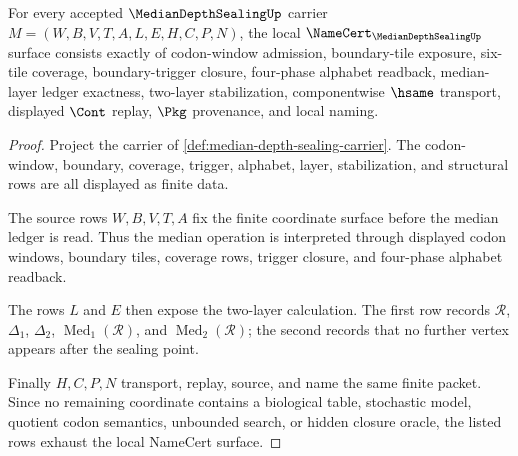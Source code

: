 \begin{theorem}
\label{thm:median-depth-sealing-namecert-obligations}
For every accepted $\MedianDepthSealingUp$ carrier $M=(W,B,V,T,A,L,E,H,C,P,N)$, the local $\NameCert_{\MedianDepthSealingUp}$ surface consists exactly of codon-window admission, boundary-tile exposure, six-tile coverage, boundary-trigger closure, four-phase alphabet readback, median-layer ledger exactness, two-layer stabilization, componentwise $\hsame$ transport, displayed $\Cont$ replay, $\Pkg$ provenance, and local naming.
\end{theorem}
\begin{proof}
Project the carrier of \autoref{def:median-depth-sealing-carrier}. The codon-window, boundary, coverage, trigger, alphabet, layer, stabilization, and structural rows are all displayed as finite data.

The source rows $W,B,V,T,A$ fix the finite coordinate surface before the median ledger is read. Thus the median operation is interpreted through displayed codon windows, boundary tiles, coverage rows, trigger closure, and four-phase alphabet readback.

The rows $L$ and $E$ then expose the two-layer calculation. The first row records $\mathcal{R}$, $\Delta_{1}$, $\Delta_{2}$, $\operatorname{Med}_{1}(\mathcal{R})$, and $\operatorname{Med}_{2}(\mathcal{R})$; the second records that no further vertex appears after the sealing point.

Finally $H,C,P,N$ transport, replay, source, and name the same finite packet. Since no remaining coordinate contains a biological table, stochastic model, quotient codon semantics, unbounded search, or hidden closure oracle, the listed rows exhaust the local NameCert surface.
\end{proof}

